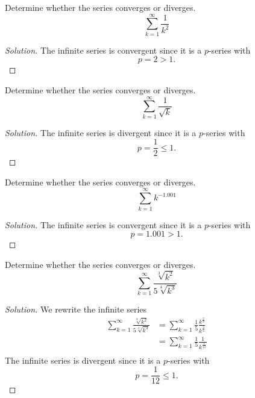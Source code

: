 \documentclass[compacto,10pt,comentarios]{aleph-notas}
\begin{document}
\begin{ejer}
    Determine whether the series converges or diverges.
    $$
        \sum_{k=1}^{\infty} \frac{1}{k^2}
    $$
\end{ejer}
\begin{proof}[Solution]
    The infinite series is convergent since it is a $p$-series with
    $$
        p = 2 > 1.
    $$
\end{proof}

\begin{ejer}
    Determine whether the series converges or diverges.
    $$
        \sum_{k=1}^{\infty} \frac{1}{\sqrt{k}}
    $$
\end{ejer}
\begin{proof}[Solution]
    The infinite series is divergent since it is a $p$-series with
    $$
        p = \frac{1}{2} \leq 1.
    $$
\end{proof}

\begin{ejer}
    Determine whether the series converges or diverges.
    $$
        \sum_{k=1}^{\infty} k^{-1.001}
    $$
\end{ejer}
\begin{proof}[Solution]
    The infinite series is convergent since it is a $p$-series with
    $$
        p = 1.001 > 1.
    $$
\end{proof}

\begin{ejer}
    Determine whether the series converges or diverges.
    $$
        \sum_{k=1}^{\infty} \frac{\sqrt[3]{k^2}}{5\sqrt[4]{k^3}}
    $$
\end{ejer}
\begin{proof}[Solution]
    We rewrite the infinite series
    \begin{align*}
        \sum_{k=1}^{\infty} \frac{\sqrt[3]{k^2}}{5\sqrt[4]{k^3}}
            & = \sum_{k=1}^{\infty} \frac{1}{5} \frac{k^{\frac{2}{3}}}{k^{\frac{3}{4}}} \\
            & = \sum_{k=1}^{\infty} \frac{1}{5} \frac{1}{k^\frac{1}{12}} \\
    \end{align*}
    The infinite series is divergent since it is a $p$-series with 
    $$
        p = \frac{1}{12} \leq 1.
    $$
\end{proof}
\end{document}
